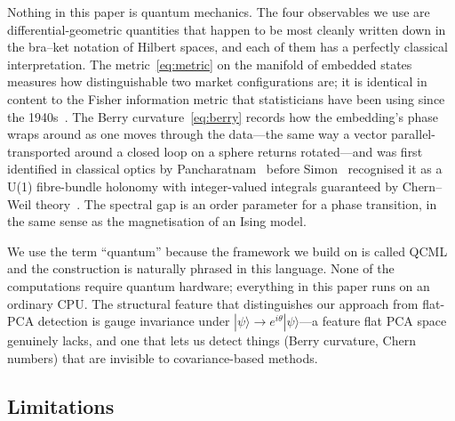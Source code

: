\documentclass[3p]{elsarticle}
\newcommand{\ket}[1]{|#1\rangle}
\begin{document}
Nothing in this paper is quantum mechanics.  The four observables
we use are differential-geometric quantities that happen to be most
cleanly written down in the bra--ket notation of Hilbert spaces, and
each of them has a perfectly classical interpretation.  The
metric~\eqref{eq:metric} on the manifold of embedded states measures
how distinguishable two market configurations are; it is identical
in content to the Fisher information metric that statisticians have
been using since the 1940s~\cite{provost_vallee1980}.  The Berry
curvature~\eqref{eq:berry} records how the embedding's phase wraps
around as one moves through the data---the same way a vector
parallel-transported around a closed loop on a sphere returns
rotated---and was first identified in classical optics by
Pancharatnam~\cite{pancharatnam1956} before Simon~\cite{simon1983}
recognised it as a U(1) fibre-bundle holonomy with integer-valued
integrals guaranteed by Chern--Weil
theory~\cite{chern1946,nakahara2003}.  The spectral gap is an order
parameter for a phase transition, in the same sense as the
magnetisation of an Ising model.

We use the term ``quantum'' because the framework we build on is
called QCML~\cite{schuld_killoran2019,busemeyer2012} and the
construction is naturally phrased in this language.  None of the
computations require quantum hardware; everything in this paper
runs on an ordinary CPU.  The structural feature that distinguishes
our approach from flat-PCA detection is gauge invariance under
$\ket{\psi} \to e^{i\theta}\ket{\psi}$---a feature flat PCA space
genuinely lacks, and one that lets us detect things (Berry
curvature, Chern numbers) that are invisible to covariance-based
methods.

\subsection{Limitations}
\end{document}
